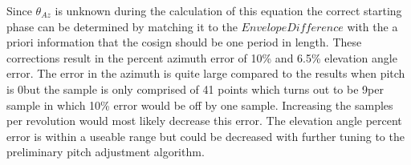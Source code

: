Since $\theta_{Az}$ is unknown during the calculation of this equation the correct starting phase can be determined by matching it to the $EnvelopeDifference$ with the a priori information that the cosign should be one period in length. These corrections result in the percent azimuth error of 10\% and 6.5\% elevation angle error. The error in the azimuth is quite large compared to the results when pitch is 0\textdegree but the sample is only comprised of 41 points which turns out to be 9\textdegree per sample in which 10\% error would be off by one sample. Increasing the samples per revolution would most likely decrease this error. The elevation angle percent error is within a useable range but could be decreased with further tuning to the preliminary pitch adjustment algorithm.



